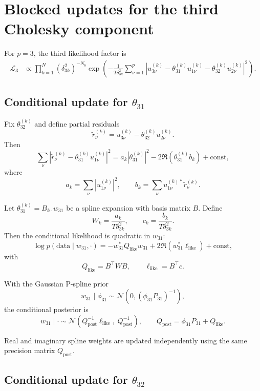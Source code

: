 \section{Blocked updates for the third Cholesky component}

For $p=3$, the third likelihood factor is
\begin{align}
\mathcal{L}_3
&\propto
\prod_{k=1}^{N}
(\delta_{3k}^2)^{-N_b}
\exp\!\left(
-\frac{1}{T\delta_{3k}^2}
\sum_{\nu=1}^{p}
\left|
u^{(k)}_{3\nu}
-
\theta_{31}^{(k)} u^{(k)}_{1\nu}
-
\theta_{32}^{(k)} u^{(k)}_{2\nu}
\right|^2
\right).
\end{align}

\subsection{Conditional update for $\theta_{31}$}

Fix $\theta_{32}^{(k)}$ and define partial residuals
\[
\tilde r^{(k)}_{\nu}
=
u^{(k)}_{3\nu}
-
\theta_{32}^{(k)} u^{(k)}_{2\nu}.
\]
Then
\[
\sum_{\nu}
\left|
\tilde r^{(k)}_{\nu}
-
\theta_{31}^{(k)} u^{(k)}_{1\nu}
\right|^2
=
a_k |\theta_{31}^{(k)}|^2
-
2\Re\!\left(\theta_{31}^{(k)} b_k\right)
+ \text{const},
\]
where
\[
a_k = \sum_{\nu} |u^{(k)}_{1\nu}|^2,
\qquad
b_k = \sum_{\nu} u^{(k)*}_{1\nu}\tilde r^{(k)}_{\nu}.
\]

Let $\theta_{31}^{(k)} = B_{k\cdot} w_{31}$ be a spline expansion with basis matrix $B$.
Define
\[
W_k = \frac{a_k}{T\delta_{3k}^2},
\qquad
c_k = \frac{b_k}{T\delta_{3k}^2}.
\]
Then the conditional likelihood is quadratic in $w_{31}$:
\[
\log p(\text{data}\mid w_{31},\cdot)
=
- w_{31}^* Q_{\text{like}} w_{31}
+
2\Re\!\left(w_{31}^* \ell_{\text{like}}\right)
+ \text{const},
\]
with
\[
Q_{\text{like}} = B^\top W B,
\qquad
\ell_{\text{like}} = B^\top c.
\]

With the Gaussian P-spline prior
\[
w_{31} \mid \phi_{31} \sim \mathcal{N}\!\left(0,(\phi_{31} P_{31})^{-1}\right),
\]
the conditional posterior is
\[
w_{31} \mid \cdot
\sim
\mathcal{N}\!\left(
Q_{\text{post}}^{-1}\ell_{\text{like}},
\; Q_{\text{post}}^{-1}
\right),
\qquad
Q_{\text{post}} = \phi_{31} P_{31} + Q_{\text{like}}.
\]

Real and imaginary spline weights are updated independently using the same precision matrix $Q_{\text{post}}$.

\newpage

\subsection{Conditional update for $\theta_{32}$}



